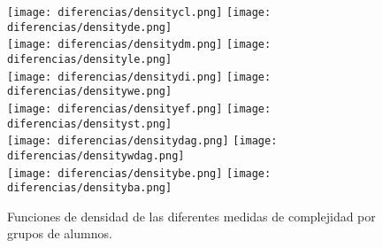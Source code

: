 \begin{figure}[H]
\centering
\texttt{[image: diferencias/densitycl.png]}
\texttt{[image: diferencias/densityde.png]} \\
\texttt{[image: diferencias/densitydm.png]}
\texttt{[image: diferencias/densityle.png]} \\
\texttt{[image: diferencias/densitydi.png]}
\texttt{[image: diferencias/densitywe.png]} \\
\texttt{[image: diferencias/densityef.png]}
\texttt{[image: diferencias/densityst.png]} \\
\texttt{[image: diferencias/densitydag.png]}
\texttt{[image: diferencias/densitywdag.png]} \\
\texttt{[image: diferencias/densitybe.png]}
\texttt{[image: diferencias/densityba.png]}
\caption{Funciones de densidad de las diferentes medidas de complejidad por grupos de alumnos.}
\label{fig:tstudentcomplexitydensity}
\end{figure}

